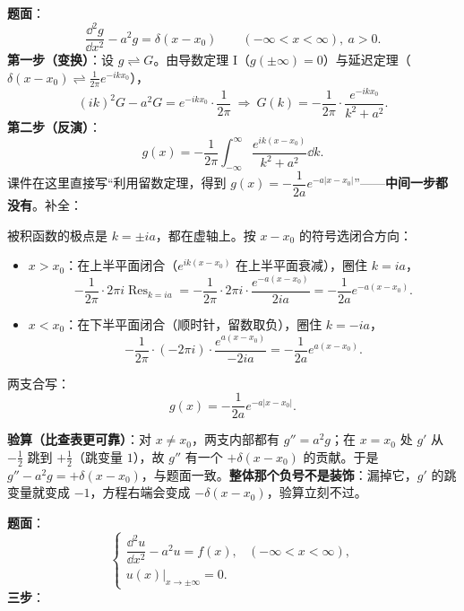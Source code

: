 \documentclass[11pt]{ctexart}
\begin{document}

\textbf{题面}：
\[ \frac{\dd^{2}g}{\dd x^{2}}-a^{2}g=\delta(x-x_0)\qquad(-\infty<x<\infty),\ a>0 .\]
\textbf{第一步（变换）}：设 $g\rightleftharpoons G$。由导数定理 I（$g(\pm\infty)=0$）与延迟定理（$\delta(x-x_0)\rightleftharpoons\frac{1}{2\pi}e^{-ikx_0}$），
\[ (ik)^{2}G-a^{2}G=e^{-ikx_0}\cdot\frac{1}{2\pi}\ \Longrightarrow\ G(k)=-\frac{1}{2\pi}\cdot\frac{e^{-ikx_0}}{k^{2}+a^{2}} .\]
\textbf{第二步（反演）}：
\[ g(x)=-\frac{1}{2\pi}\int_{-\infty}^{\infty}\frac{e^{ik(x-x_0)}}{k^{2}+a^{2}}\dd k .\]
课件在这里直接写“利用留数定理，得到 $g(x)=-\dfrac{1}{2a}e^{-a|x-x_0|}$”——\textbf{中间一步都没有}。补全：

被积函数的极点是 $k=\pm ia$，都在虚轴上。按 $x-x_0$ 的符号选闭合方向：

\begin{itemize}
\item $x>x_0$：在上半平面闭合（$e^{ik(x-x_0)}$ 在上半平面衰减），圈住 $k=ia$，
\[
-\frac{1}{2\pi}\cdot 2\pi i\operatorname{Res}_{k=ia}
=-\frac{1}{2\pi}\cdot 2\pi i\cdot\frac{e^{-a(x-x_0)}}{2ia}
=-\frac{1}{2a}e^{-a(x-x_0)} .
\]
\item $x<x_0$：在下半平面闭合（顺时针，留数取负），圈住 $k=-ia$，
\[
-\frac{1}{2\pi}\cdot\left(-2\pi i\right)\cdot\frac{e^{a(x-x_0)}}{-2ia}
=-\frac{1}{2a}e^{a(x-x_0)} .
\]
\end{itemize}

两支合写：
\[ g(x)=-\frac{1}{2a}e^{-a|x-x_0|} .\]

\textbf{验算（比查表更可靠）}：对 $x\ne x_0$，两支内部都有 $g''=a^{2}g$；在 $x=x_0$ 处 $g'$ 从 $-\frac12$ 跳到 $+\frac12$（跳变量 $1$），故 $g''$ 有一个 $+\delta(x-x_0)$ 的贡献。于是 $g''-a^{2}g=+\delta(x-x_0)$，与题面一致。\textbf{整体那个负号不是装饰}：漏掉它，$g'$ 的跳变量就变成 $-1$，方程右端会变成 $-\delta(x-x_0)$，验算立刻不过。


\textbf{题面}：
\[
\begin{cases}
\dfrac{\dd^{2}u}{\dd x^{2}}-a^{2}u=f(x), & (-\infty<x<\infty),\\[6pt]
u(x)\Big|_{x\to\pm\infty}=0 .
\end{cases}
\]
\textbf{三步}：
\end{document}

